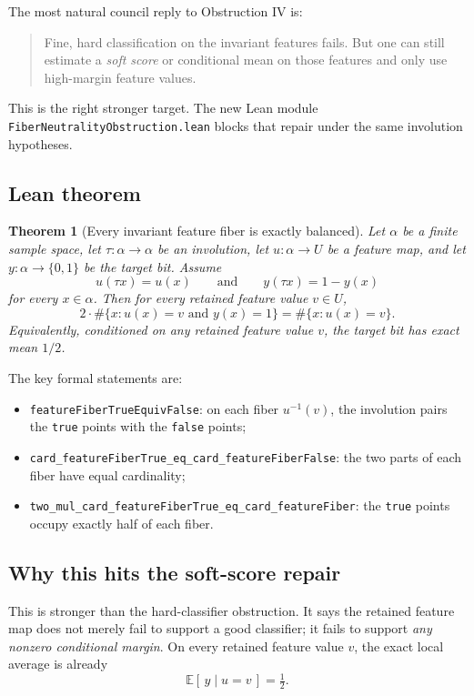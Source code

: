 \documentclass[11pt]{article}
\newtheorem{theorem}{Theorem}[section]
\theoremstyle{remark}
\begin{document}
The most natural council reply to Obstruction IV is:
\begin{quote}
Fine, hard classification on the invariant features fails.  But one can still estimate a
\emph{soft score} or conditional mean on those features and only use high-margin feature values.
\end{quote}

This is the right stronger target.  The new Lean module
\texttt{FiberNeutralityObstruction.lean} blocks that repair under the same involution
hypotheses.

\subsection{Lean theorem}

\begin{theorem}[Every invariant feature fiber is exactly balanced]
Let \(\alpha\) be a finite sample space, let \(\tau : \alpha \to \alpha\) be an involution, let
\(u : \alpha \to U\) be a feature map, and let \(y : \alpha \to \{0,1\}\) be the target bit.
Assume
\[
  u(\tau x) = u(x)
  \qquad\text{and}\qquad
  y(\tau x) = 1 - y(x)
\]
for every \(x \in \alpha\).  Then for every retained feature value \(v \in U\),
\[
  2 \cdot \#\{x : u(x)=v \text{ and } y(x)=1\}
  =
  \#\{x : u(x)=v\}.
\]
Equivalently, conditioned on any retained feature value \(v\), the target bit has exact mean
\(1/2\).
\end{theorem}

\noindent
The key formal statements are:
\begin{itemize}[leftmargin=1.5em]
  \item \texttt{featureFiberTrueEquivFalse}: on each fiber \(u^{-1}(v)\), the involution pairs
  the \texttt{true} points with the \texttt{false} points;
  \item \texttt{card\_featureFiberTrue\_eq\_card\_featureFiberFalse}: the two parts of each fiber
  have equal cardinality;
  \item \texttt{two\_mul\_card\_featureFiberTrue\_eq\_card\_featureFiber}: the \texttt{true}
  points occupy exactly half of each fiber.
\end{itemize}

\subsection{Why this hits the soft-score repair}

This is stronger than the hard-classifier obstruction.  It says the retained feature map does not
merely fail to support a good classifier; it fails to support \emph{any nonzero conditional
margin}.  On every retained feature value \(v\), the exact local average is already
\[
  \mathbb{E}[\,y \mid u=v\,] = \tfrac12.
\]
\end{document}
